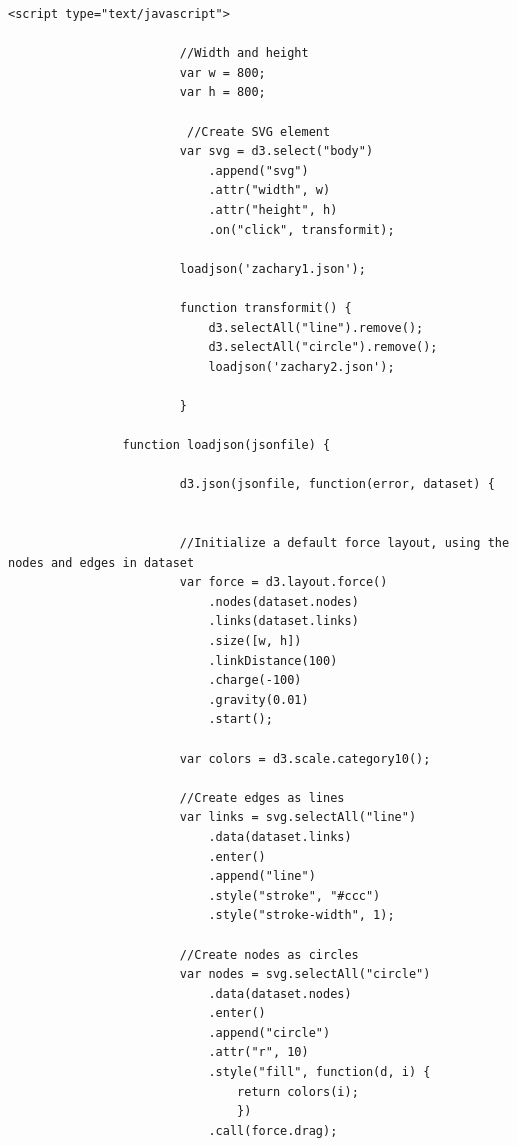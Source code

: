\documentclass{article}
\begin{document}
\begin{lstlisting}[frame=single, caption=index.html, label=webpage]
                <script type="text/javascript">

                        //Width and height
                        var w = 800;
                        var h = 800;
                        
                         //Create SVG element
                        var svg = d3.select("body")
                        	.append("svg")
                            .attr("width", w)
                            .attr("height", h)
                            .on("click", transformit);
                            
                        loadjson('zachary1.json');
                            
                		function transformit() {
                			d3.selectAll("line").remove();
                			d3.selectAll("circle").remove();
                			loadjson('zachary2.json');            
                
                		}

				function loadjson(jsonfile) {
                        
                        d3.json(jsonfile, function(error, dataset) {
                       
                        
                        //Initialize a default force layout, using the nodes and edges in dataset
                        var force = d3.layout.force()
                        	.nodes(dataset.nodes)
                            .links(dataset.links)
                            .size([w, h])
                            .linkDistance(100)
                            .charge(-100)
                            .gravity(0.01)
                            .start();

                        var colors = d3.scale.category10();
                        
                        //Create edges as lines
                        var links = svg.selectAll("line")
                        	.data(dataset.links)
                            .enter()
                            .append("line")
                            .style("stroke", "#ccc")
                            .style("stroke-width", 1);
                        
                        //Create nodes as circles
                        var nodes = svg.selectAll("circle")
                            .data(dataset.nodes)
                            .enter()
                            .append("circle")
                            .attr("r", 10)
                            .style("fill", function(d, i) {
                                return colors(i);
                                })
                            .call(force.drag);
                    

\end{lstlisting}
\end{document}

